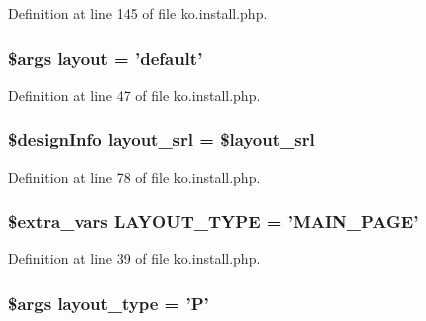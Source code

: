 Definition at line 145 of file ko.\+install.\+php.

\hypertarget{ko_8install_8php_a0dc2cdff7167f362443808ff71ae5177}{
\subsubsection[{layout}]{\setlength{\rightskip}{0pt plus 5cm}\$args {\bf layout} = 'default'}}\label{ko_8install_8php_a0dc2cdff7167f362443808ff71ae5177}


Definition at line 47 of file ko.\+install.\+php.

\hypertarget{ko_8install_8php_a70054876db09b2519a1726663c8dd9e7}{
\subsubsection[{layout\+\_\+srl}]{\setlength{\rightskip}{0pt plus 5cm}\$design\+Info layout\+\_\+srl = \$layout\+\_\+srl}}\label{ko_8install_8php_a70054876db09b2519a1726663c8dd9e7}


Definition at line 78 of file ko.\+install.\+php.

\hypertarget{ko_8install_8php_a559e719d2ff17f12b8fba72773e6601d}{
\subsubsection[{L\+A\+Y\+O\+U\+T\+\_\+\+T\+Y\+P\+E}]{\setlength{\rightskip}{0pt plus 5cm}\${\bf extra\+\_\+vars} L\+A\+Y\+O\+U\+T\+\_\+\+T\+Y\+P\+E = 'M\+A\+I\+N\+\_\+\+P\+A\+G\+E'}}\label{ko_8install_8php_a559e719d2ff17f12b8fba72773e6601d}


Definition at line 39 of file ko.\+install.\+php.

\hypertarget{ko_8install_8php_a0532d89570cfdaebc628afac2ff5a81b}{
\subsubsection[{layout\+\_\+type}]{\setlength{\rightskip}{0pt plus 5cm}\$args layout\+\_\+type = 'P'}}\label{ko_8install_8php_a0532d89570cfdaebc628afac2ff5a81b}


